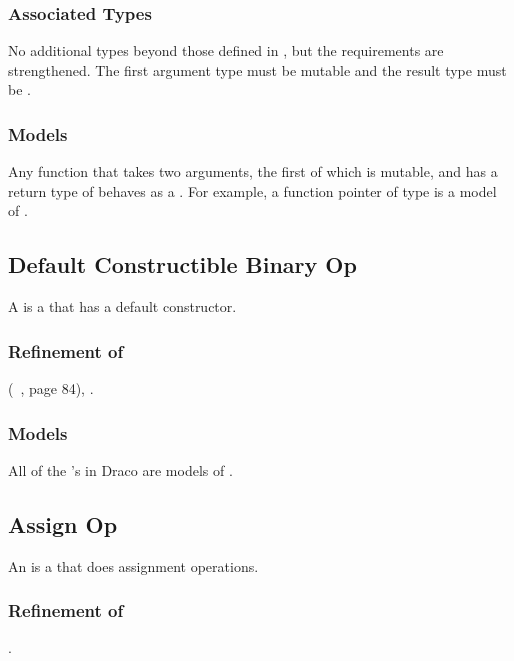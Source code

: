 \documentclass[11pt]{rnote}
\begin{document}
\subsubsection{Associated Types}

No additional types beyond those defined in , 
but the requirements are strengthened. The first argument type must be 
mutable and the result type must be .

\subsubsection{Models}

Any function that takes two arguments, the first of which is mutable,
and has a return type of  behaves as a . For example, a function pointer of type  is a model of .

\bigskip

\subsection{Default Constructible Binary Op}

A  is a 
that has a default constructor.

\subsubsection{Refinement of}
 (~\cite{au99}, page 84), .

\subsubsection{Models}

All of the  's in Draco are
models of .

\newpage

\subsection{Assign Op}

An  is a 
that does assignment operations.

\subsubsection{Refinement of}
.
\end{document}
